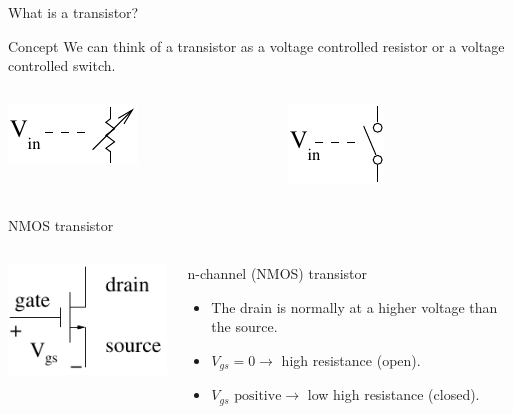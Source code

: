 \begin{frame}{What is a transistor?}
  \begin{block}{Concept}
    We can think of a transistor as a voltage controlled resistor or a voltage controlled switch.
  \end{block}
  \begin{columns}
    \begin{column}{3cm}
      \begin{center}
        \includegraphics{VoltageControlledResistor}
      \end{center}
    \end{column}
    \begin{column}{3cm}
      \begin{center}
        \includegraphics{VoltageControlledSwitch}
      \end{center}
    \end{column}
  \end{columns}
\end{frame}

\begin{frame}{NMOS transistor}
  \begin{columns}
    \begin{column}{3cm}
      \includegraphics{NMOSAnnotated}
    \end{column}
    \begin{column}{7cm}
      n-channel (NMOS) transistor
      \begin{itemize}
        \item The drain is normally at a higher voltage than the source.
        \item $V_{gs} = 0 \rightarrow$  high resistance (open).
        \item $V_{gs} \text{ positive} \rightarrow$ low high resistance (closed).
      \end{itemize}
    \end{column}
  \end{columns}
\end{frame}

